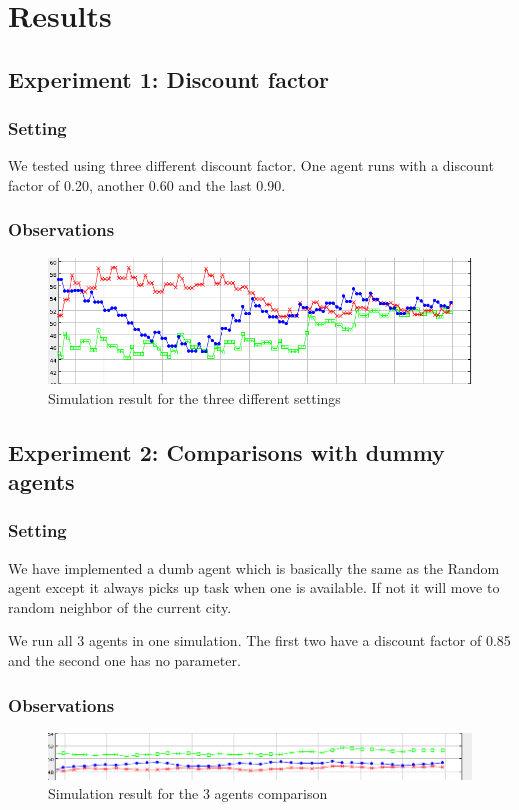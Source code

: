 \documentclass[11pt]{article}
\begin{document}
\section{Results}

\subsection{Experiment 1: Discount factor}

\subsubsection{Setting}
We tested using three different discount factor. One agent runs with a
discount factor of 0.20, another 0.60 and the last 0.90.

\subsubsection{Observations}
\begin{figure}
  \caption{Simulation result for the three different settings}
  \includegraphics{compare_discount}
  \centering
\end{figure}

\subsection{Experiment 2: Comparisons with dummy agents}

\subsubsection{Setting}
We have implemented a dumb agent which is basically the same as the
Random agent except it always picks up task when one is available. If
not it will move to random neighbor of the current city.

We run all 3 agents in one simulation. The first two have a discount
factor of 0.85 and the second one has no parameter.

\subsubsection{Observations}
\begin{figure}
  \caption{Simulation result for the 3 agents comparison}
  \includegraphics{compare_3}
\end{figure}
\end{document}
